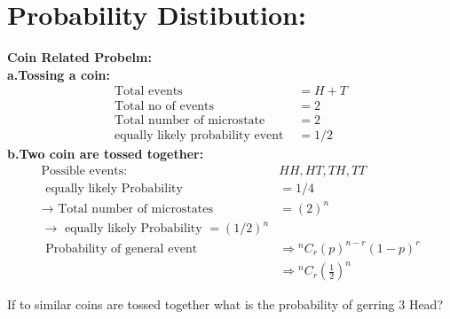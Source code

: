 \section{ Probability Distibution: }
\textbf{Coin Related Probelm: }\\
\textbf{a.\quad  Tossing a coin:}\\
\begin{align*}
\text{Total events }&=H+T\\
\text{Total no of events }&=2\\
\text{Total number of microstate }&=2\\
\text{equally likely probability event }&=1 / 2
\end{align*}
\textbf{b.\quad  Two coin are tossed together:}\\
\begin{align*}
\text{Possible events: }&H H, H T, T H, T T\\
\text{ equally likely Probability }&=1 / 4\\
\rightarrow\text{ Total number of microstates }&=(2)^{n}\\
\rightarrow\text{ equally likely Probability }=(1 / 2)^{n}\\
\text { Probability of general event }& 
\Rightarrow{ }^{n} C_{r}(p)^{n-r}(1-p)^{r} \\
&\Rightarrow{ }^{n} C_{r}\left(\frac{1}{2}\right)^{n}
\end{align*}
\begin{exercise}
	If to similar coins are tossed together what is the probability of gerring 3 Head?
\end{exercise}

